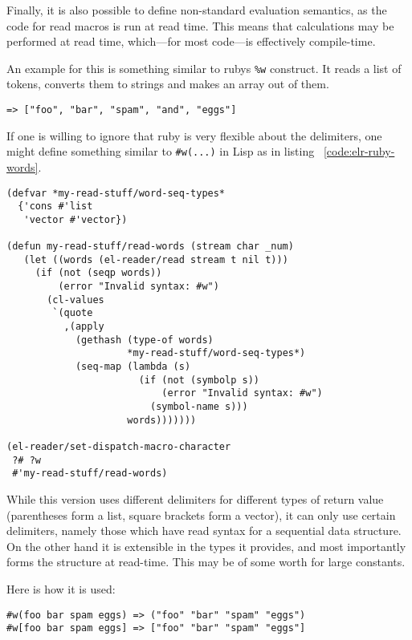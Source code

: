 \documentclass[a4paper,10pt,twoside]{report}
\begin{document}
Finally, it is also possible to define non-standard evaluation semantics, as the
code for read macros is run at read time.  This means that calculations may be
performed at read time, which---for most code---is effectively compile-time.

An example for this is something similar to rubys \texttt{\%w} construct.  It
reads a list of tokens, converts them to strings and makes an array out of
them.  

\begin{lstlisting}[style=rubyinline]
%w(foo bar spam and eggs) 
=> ["foo", "bar", "spam", "and", "eggs"]
\end{lstlisting}

If one is willing to ignore that ruby is very flexible about the delimiters, one
might define something similar to \texttt{\#w(...)} in Lisp as in listing
~\ref{code:elr-ruby-words}.

\begin{lstlisting}[style=lispcode,caption={A read macro for rubys word
  syntax.}, label={code:elr-ruby-words}]
(defvar *my-read-stuff/word-seq-types*
  {'cons #'list 
   'vector #'vector})

(defun my-read-stuff/read-words (stream char _num)
   (let ((words (el-reader/read stream t nil t)))
     (if (not (seqp words))
         (error "Invalid syntax: #w")
       (cl-values
        `(quote
          ,(apply
            (gethash (type-of words)
                     *my-read-stuff/word-seq-types*)
            (seq-map (lambda (s)
                       (if (not (symbolp s))
                           (error "Invalid syntax: #w")
                         (symbol-name s)))
                     words)))))))

(el-reader/set-dispatch-macro-character
 ?# ?w
 #'my-read-stuff/read-words)
\end{lstlisting}

While this version uses different delimiters for different types of return value
(parentheses form a list, square brackets form a vector), it can only use
certain delimiters, namely those which have read syntax for a sequential data
structure.  On the other hand it is extensible in the types it provides, and
most importantly forms the structure at read-time.  This may be of some worth
for large constants.

Here is how it is used:

\begin{lstlisting}[style=rubyinline]
#w(foo bar spam eggs) => ("foo" "bar" "spam" "eggs")
#w[foo bar spam eggs] => ["foo" "bar" "spam" "eggs"]
\end{lstlisting}
\end{document}
